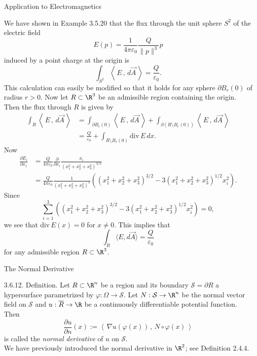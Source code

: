 \documentclass[smaller,hyperref={CJKbookmarks=true}]{beamer}
\newcommand{\scp}[2]{\left\langle\,#1\,,\,#2\,\right\rangle} \newcommand{\scpp}{\langle\,\cdot\,,\,\cdot\,\rangle}
\begin{document}
\begin{frame}{Application to Electromagnetics}
\begin{spacing}{1}
We have shown in Example 3.5.20 that the flux through the unit sphere $S^2$ of the electric field
\[E(p)=\frac{1}{4\pi\varepsilon_0}\frac{Q}{\|p\|^3}p\]
induced by a point charge at the origin is
\[\int_{S^2}\scp{E}{d\vec{A}}=\frac{Q}{\varepsilon_0}.\]
This calculation can easily be modified so that it holds for any sphere $\partial B_r(0)$ of radius $r>0$. Now let $R\subset\R^3$ be an admissible region containing the origin. Then the flux through $R$ is given by
\begin{equation*}
  \begin{split}
     \int_R\scp{E}{d\vec{A}} &=\int_{\partial B_r(0)}\scp{E}{d\vec{A}}+\int_{\partial(R\setminus B_r(0))}\scp{E}{d\vec{A}} \\
       &=\frac{Q}{\varepsilon_0}+\int_{R\setminus B_r(0)}\text{div}\,E\,dx.
  \end{split}
\end{equation*}
\newpage
Now
\begin{equation*}
  \begin{split}
     \frac{\partial E_i}{\partial x_1} &=\frac{Q}{4\pi\varepsilon_0}\frac{\partial}{\partial x_i}\frac{x_i}{(x_1^2+x_2^2+x_3^2)^{3/2}} \\
       &=\frac{Q}{4\pi\varepsilon_0}\frac{1}{(x_1^2+x_2^2+x_3^2)^3}\left(
       (x_1^2+x_2^2+x_3^2)^{3/2}-3(x_1^2+x_2^2+x_3^2)^{1/2}x_i^2\right).
  \end{split}
\end{equation*}
Since
\[\sum_{i=1}^{3}\left((x_1^2+x_2^2+x_3^2)^{3/2}-3(x_1^2+x_2^2+x_3^2)^{1/2}x_i^2\right)=0,\]
we see that $\text{div}\,E(x)=0$ for $x\neq0$. This implies that
\[\int_R\langle E,d\vec{A}\rangle=\frac{Q}{\varepsilon_0}\]
for any admissible region $R\subset\R^3$.
\end{spacing}
\end{frame}
\begin{frame}[t]{The Normal Derivative}
\begin{spacing}{1}
\alert{3.6.12. Definition.} Let $R\subset\R^n$ be a region and its boundary $\mathcal{S}=\partial R$ a hypersurface parametrized by $\varphi:\Omega\to\mathcal{S}$. Let $N:\mathcal{S}\to\R^n$ be the normal vector field on $\mathcal{S}$ and $u:\overline{R}\to\R$ be a continuously dif{}ferentiable potential function. Then
\[\frac{\partial u}{\partial n}(x):=
\scp{\nabla u(\varphi(x))}{N\circ\varphi(x)}\]
is called the \emph{normal derivative} of $u$ on $\mathcal{S}$.\\[6pt]
We have previously introduced the normal derivative in $\R^2$; see Definition 2.4.4.
\end{spacing}
\end{frame}
\end{document}
